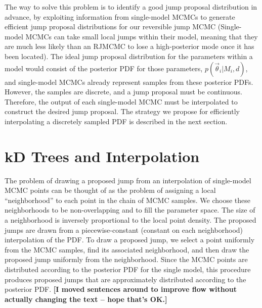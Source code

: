 \documentclass{iopart}
\newcommand{\vtheta}{\vec{\theta}}
\newcommand{\ilya}[1]{{\color{red} \bf #1}}
\begin{document}
The way to solve this problem is to identify a good jump proposal
distribution in advance, by exploiting information from single-model
MCMCs to generate efficient jump proposal distributions for our
reversible jump MCMC (Single-model MCMCs can take small local jumps
within their model, meaning that they are much less likely than an
RJMCMC to lose a high-posterior mode once it has been located).  The
ideal jump proposal distribution for the parameters within a model
would consist of the posterior PDF for those parameters,
$p(\vtheta_i|M_i,d)$, and single-model MCMCs already represent samples
from these posterior PDFs.  However, the samples are discrete, and a
jump proposal must be continuous.  Therefore, the output of each
single-model MCMC must be interpolated to construct the desired jump
proposal.  The strategy we propose for efficiently interpolating
a discretely sampled PDF is described in the next section.

\section{kD Trees and Interpolation}
\label{sec:kDTree}


The problem of drawing a proposed jump from an interpolation of
single-model MCMC points can be thought of as the problem of assigning
a local ``neighborhood'' to each point in the chain of MCMC samples.
We choose these neighborhoods to be non-overlapping and to fill the parameter
space.  The size of a
neighborhood is inversely proportional to the local point density.
The proposed jumps are drawn from a piecewise-constant (constant on
each neighborhood) interpolation of the PDF.  
To draw a proposed jump, we select a point uniformly from the
MCMC samples, find its associated neighborhood, and then draw the
proposed jump uniformly from the neighborhood.  Since the MCMC points
are distributed according to the posterior PDF for the single model,
this procedure produces proposed jumps that are approximately
distributed according to the posterior PDF.  
\ilya{[I moved sentences around to improve flow without actually changing the text -- hope that's OK.]}
\end{document}
